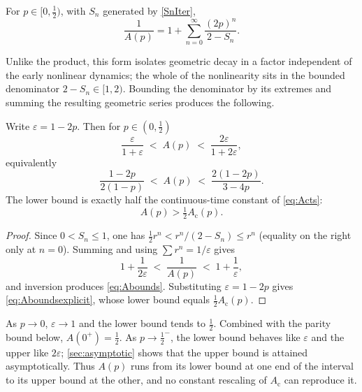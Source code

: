 \begin{proposition}
\label{prop:series}
For \(p\in[0,\tfrac12)\), with \(S_n\) generated by \cref{SnIter},
\begin{equation}
\label{eq:Aseries}
\frac{1}{A(p)} = 1 + \sum_{n=0}^{\infty}\frac{(2p)^n}{2-S_n}.
\end{equation}
\end{proposition}

Unlike the product, this form isolates geometric decay in a factor independent of the early nonlinear dynamics; the whole of the nonlinearity sits in the bounded denominator \(2-S_n\in[1,2)\). Bounding the denominator by its extremes and summing the resulting geometric series produces the following.

\begin{proposition}
\label{prop:bounds}
Write \(\varepsilon = 1-2p\). Then for \(p\in(0,\tfrac12)\)
\begin{equation}
\label{eq:Abounds}
\frac{\varepsilon}{1+\varepsilon} \;<\; A(p) \;<\; \frac{2\varepsilon}{1+2\varepsilon},
\end{equation}
equivalently
\begin{equation}
\label{eq:Aboundsexplicit}
\frac{1-2p}{2(1-p)} \;<\; A(p) \;<\; \frac{2(1-2p)}{3-4p}.
\end{equation}
The lower bound is exactly half the continuous-time constant of \cref{eq:Acts}:
\begin{equation}
\label{eq:halfAc}
A(p) > \tfrac12 A_{\text{c}}(p).
\end{equation}
\end{proposition}

\begin{proof}
Since \(0<S_n\le1\), one has \(\tfrac12 r^n < r^n/(2-S_n)\le r^n\) (equality on the right only at \(n=0\)). Summing and using \(\sum r^n=1/\varepsilon\) gives
\begin{equation*}
1+\frac{1}{2\varepsilon} \;<\; \frac{1}{A(p)} \;<\; 1+\frac{1}{\varepsilon},
\end{equation*}
and inversion produces \cref{eq:Abounds}. Substituting \(\varepsilon=1-2p\) gives \cref{eq:Aboundsexplicit}, whose lower bound equals \(\tfrac12 A_{\text{c}}(p)\).
\end{proof}

As \(p\to0\), \(\varepsilon\to1\) and the lower bound tends to \(\tfrac12\). Combined with the parity bound below, \(A(0^+)=\tfrac12\). As \(p\to\tfrac12^-\), the lower bound behaves like \(\varepsilon\) and the upper like \(2\varepsilon\); \cref{sec:asymptotic} shows that the upper bound is attained asymptotically. Thus \(A(p)\) runs from its lower bound at one end of the interval to its upper bound at the other, and no constant rescaling of \(A_{\text{c}}\) can reproduce it.

